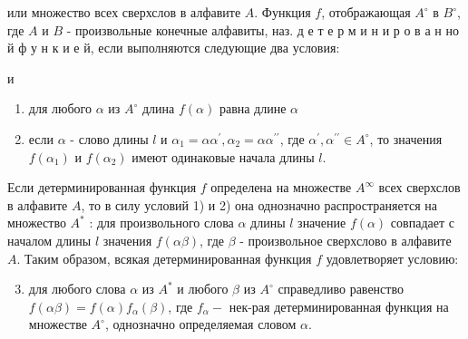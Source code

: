 \documentclass[10pt]{article}
\begin{document}
или множество всех сверхслов в алфавите $A$. Функция $f$, отображающая $A^{\circ}$ в $B^{\circ}$, где $A$ и $B$ - произвольные конечные алфавиты, наз. д е т е р м и н и р о в а н но й ф у н к и е й, если выполняются следующие два условия:



и



\begin{enumerate}

  \item для любого $\alpha$ из $A^{\circ}$ длина $f(\alpha)$ равна длине $\alpha$



  \item если $\alpha$ - слово длины $l$ и $\alpha_{1}=\alpha \alpha^{\prime}, \alpha_{2}=\alpha \alpha^{\prime \prime}$, где $\alpha^{\prime}, \alpha^{\prime \prime} \in A^{\circ}$, то значения $f\left(\alpha_{1}\right)$ и $f\left(\alpha_{2}\right)$ имеют одинаковые начала длины $l$.



\end{enumerate}



Если детерминированная функция $f$ определена на множестве $A^{\infty}$ всех сверхслов в алфавите $A$, то в силу условий 1) и 2) она однозначно распространяется на множество $A^{*}$ : для произвольного слова $\alpha$ длины $l$ значение $f(\alpha)$ совпадает с началом длины $l$ значения $f(\alpha \beta)$, где $\beta$ - произвольное сверхслово в алфавите $A$. Таким образом, всякая детерминированная функция $f$ удовлетворяет условию:



\begin{enumerate}

  \setcounter{enumi}{2}

  \item для любого слова $\alpha$ из $A^{*}$ и любого $\beta$ из $A^{\circ}$ справедливо равенство $f(\alpha \beta)=f(\alpha) f_{\alpha}(\beta)$, где $f_{\alpha}-$ нек-рая детерминированная функция на множестве $A^{\circ}$, однозначно определяемая словом $\alpha$.

\end{enumerate}
\end{document}
